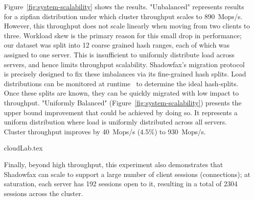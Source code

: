 Figure~\ref{fig:system-scalability} shows the results.
%
"Unbalanced" represents results for a zipfian distribution under which
cluster throughput scales to 890~Mops/s.
%
However, this throughput does not scale linearly when moving from two
clients to three.
%
Workload skew is the primary reason for this small drop in performance;
our dataset was split into 12 coarse grained hash ranges, each of
which was assigned to one server.
%
This is insufficient to uniformly distribute load across servers, and
hence limits throughput scalability.
%
%
%
Shadowfax's migration protocol is precisely designed to fix these
imbalances via its fine-grained hash splits.
%
Load distributions can be monitored at runtime~\cite{slicer} to
determine the ideal hash-splits.
%
Once these splits are known, they can be quickly migrated with low
impact to throughput.
%
"Uniformly Balanced" (Figure~\ref{fig:system-scalability}) presents
the upper bound improvement that could be achieved by doing so.
%
It represents a uniform distribution where load is uniformly distributed
across all servers.
%
Cluster throughput improves by 40~Mops/s (4.5\%) to 930~Mops/s.

 {cloudLab.tex}

Finally, beyond high throughput, this experiment also demonstrates that
Shadowfax can scale to support a large number of client sessions
(connections); at
saturation, each server has 192 sessions open to it, resulting in a
total of 2304 sessions across the cluster.
